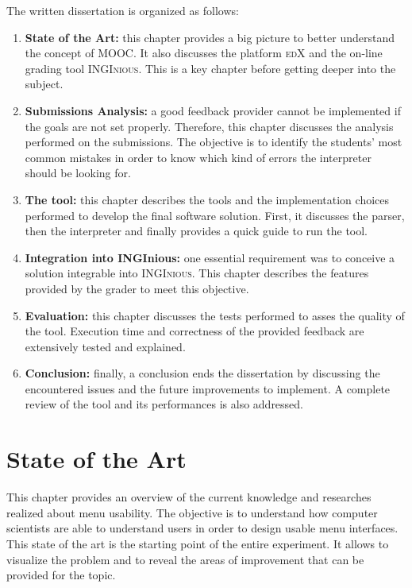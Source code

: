 \documentclass[11pt,a4paper,twoside,openright]{report}
\begin{document}
The written dissertation is organized as follows:
\begin{enumerate}
 \item \textbf{State of the Art:} this chapter provides a big picture to 
better understand the concept of \textsc{MOOC}. It also 
discusses the platform \textsc{edX} and the on-line grading tool 
\textsc{INGInious}. This is a key chapter before getting deeper into the 
subject.
  \item \textbf{Submissions Analysis:} a good feedback provider cannot be 
implemented if the goals are not set properly. Therefore, this chapter 
discusses the analysis performed on the submissions. The objective is to 
identify the students' most common mistakes in order to know which kind of 
errors the interpreter should be looking for.
  \item \textbf{The tool:} this chapter describes the tools and the 
implementation choices performed to develop the final software solution. 
First, it discusses the parser, then the interpreter and finally provides a 
quick guide to run the tool.
  \item \textbf{Integration into INGInious:} one essential requirement was to 
conceive a solution integrable into \textsc{INGInious}. This chapter describes 
the features provided by the grader to meet this objective.
  \item \textbf{Evaluation:} this chapter discusses the tests performed to 
asses the quality of the tool. Execution time and correctness of the provided 
feedback are extensively tested and explained.
  \item \textbf{Conclusion:} finally, a conclusion ends the dissertation by 
discussing the encountered issues and the future improvements to implement. A 
complete review of the tool and its performances is also addressed.
\end{enumerate}

\cleardoublepage
\chapter{State of the Art}

This chapter provides an overview of the current knowledge and researches 
realized about menu usability. The objective is to understand how computer 
scientists are able to understand users in order to design usable menu 
interfaces. This state of the art is the starting point of the entire 
experiment. It allows to visualize the problem and to reveal the areas of 
improvement that can be provided for the topic.
\end{document}
